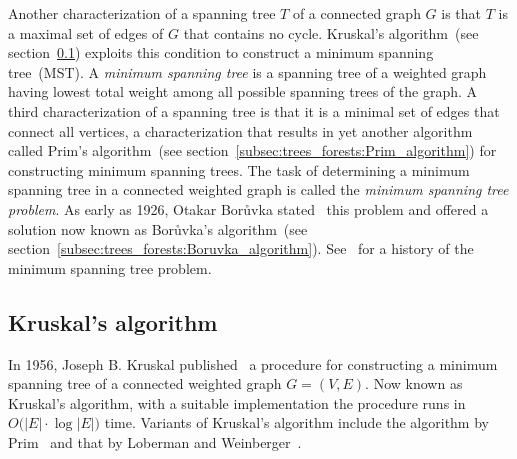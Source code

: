 Another characterization of a spanning tree $T$
of a connected graph $G$ is that $T$ is a maximal set of edges of $G$
that contains no cycle.
Kruskal's algorithm~(see
section~\ref{subsec:trees_forests:Kruskal_algorithm}) exploits this
condition to construct a minimum spanning
tree~(MST). A
\emph{minimum spanning tree} is a
spanning tree of a weighted
graph having lowest total weight among all possible
spanning trees of the graph. A third
characterization of a spanning tree is that it is
a minimal set of edges that connect all vertices, a characterization
that results in yet another algorithm called
Prim's algorithm~(see
section~\ref{subsec:trees_forests:Prim_algorithm}) for constructing
minimum spanning trees. The task of
determining a minimum spanning tree in a
connected weighted graph is called the
\emph{minimum spanning tree problem}.
As early as 1926, Otakar Bor\r{u}vka
stated~\cite{Boruvka1926a,Boruvka1926b} this problem and offered a
solution now known as Bor\r{u}vka's
algorithm~(see
section~\ref{subsec:trees_forests:Boruvka_algorithm}).
See~\cite{GrahamHell1985, Mares2008} for a history of the
minimum spanning tree problem.



\subsection{Kruskal's algorithm}
\label{subsec:trees_forests:Kruskal_algorithm}

In 1956, Joseph B. Kruskal
published~\cite{Kruskal1956} a procedure for constructing a
minimum spanning tree of a connected
weighted graph $G = (V,E)$. Now known as
Kruskal's algorithm, with a suitable
implementation the procedure runs in $O\big(|E| \cdot \log |E|\big)$
time. Variants of Kruskal's algorithm
include the algorithm by Prim~\cite{Prim1957} and
that by Loberman and
Weinberger~\cite{LobermanWeinberger1957}.


